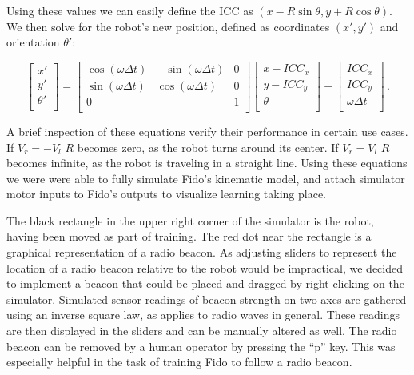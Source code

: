 Using these values we can easily define the ICC as $(x - R\sin\theta,y + R\cos\theta)$.  We then solve for the robot's new position, defined as coordinates $(x',y')$ and orientation $\theta'$:

\begin{equation}
	\begin{bmatrix}
	    x'      \\
	    y'      \\
	    \theta' \\
	\end{bmatrix} =
	\begin{bmatrix}
		\cos(\omega\Delta t) & -\sin(\omega\Delta t) & 0 \\
		\sin(\omega\Delta t) & \cos(\omega\Delta t)  & 0 \\
		0                    &                       & 1 \\
	\end{bmatrix}
	\begin{bmatrix}
		x - ICC_x  \\
		y - ICC_y  \\
		\theta     \\
	\end{bmatrix} + 
	\begin{bmatrix}
		ICC_x          \\
		ICC_y          \\
		\omega\Delta t \\
	\end{bmatrix} \,.
\end{equation}

A brief inspection of these equations verify their performance in certain use cases.  If $V_r = -V_l$ $R$ becomes zero, as the robot turns around its center.  If $V_r = V_l$ $R$ becomes infinite, as the robot is traveling in a straight line.  Using these equations we were were able to fully simulate Fido's kinematic model, and attach simulator motor inputs to Fido's outputs to visualize learning taking place.   

The black rectangle in the upper right corner of the simulator is the robot, having been moved as part of training.  The red dot near the rectangle is a graphical representation of a radio beacon.  As adjusting sliders to represent the location of a radio beacon relative to the robot would be impractical, we decided to implement a beacon that could be placed and dragged by right clicking on the simulator.  Simulated sensor readings of beacon strength on two axes are gathered using an inverse square law, as applies to radio waves in general.  These readings are then displayed in the sliders and can be manually altered as well.  The radio beacon can be removed by a human operator by pressing the ``p'' key.  This was especially helpful in the task of training Fido to follow a radio beacon.

